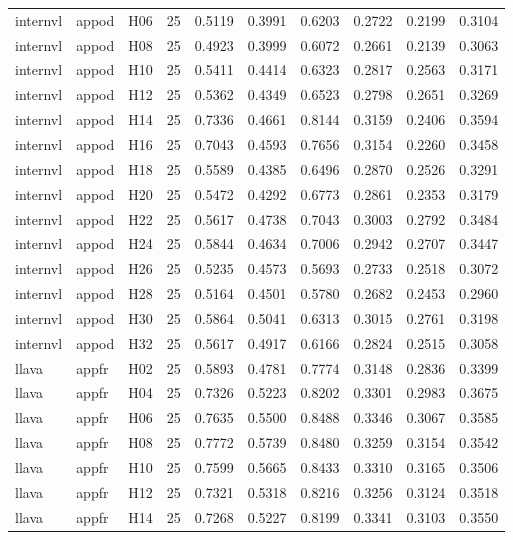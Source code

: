 \begin{table}[tbp]
\begin{tabular}{lllrrrrrrr}
internvl & appod & H06 & 25 & 0.5119 & 0.3991 & 0.6203 & 0.2722 & 0.2199 & 0.3104 \\
internvl & appod & H08 & 25 & 0.4923 & 0.3999 & 0.6072 & 0.2661 & 0.2139 & 0.3063 \\
internvl & appod & H10 & 25 & 0.5411 & 0.4414 & 0.6323 & 0.2817 & 0.2563 & 0.3171 \\
internvl & appod & H12 & 25 & 0.5362 & 0.4349 & 0.6523 & 0.2798 & 0.2651 & 0.3269 \\
internvl & appod & H14 & 25 & 0.7336 & 0.4661 & 0.8144 & 0.3159 & 0.2406 & 0.3594 \\
internvl & appod & H16 & 25 & 0.7043 & 0.4593 & 0.7656 & 0.3154 & 0.2260 & 0.3458 \\
internvl & appod & H18 & 25 & 0.5589 & 0.4385 & 0.6496 & 0.2870 & 0.2526 & 0.3291 \\
internvl & appod & H20 & 25 & 0.5472 & 0.4292 & 0.6773 & 0.2861 & 0.2353 & 0.3179 \\
internvl & appod & H22 & 25 & 0.5617 & 0.4738 & 0.7043 & 0.3003 & 0.2792 & 0.3484 \\
internvl & appod & H24 & 25 & 0.5844 & 0.4634 & 0.7006 & 0.2942 & 0.2707 & 0.3447 \\
internvl & appod & H26 & 25 & 0.5235 & 0.4573 & 0.5693 & 0.2733 & 0.2518 & 0.3072 \\
internvl & appod & H28 & 25 & 0.5164 & 0.4501 & 0.5780 & 0.2682 & 0.2453 & 0.2960 \\
internvl & appod & H30 & 25 & 0.5864 & 0.5041 & 0.6313 & 0.3015 & 0.2761 & 0.3198 \\
internvl & appod & H32 & 25 & 0.5617 & 0.4917 & 0.6166 & 0.2824 & 0.2515 & 0.3058 \\
llava & appfr & H02 & 25 & 0.5893 & 0.4781 & 0.7774 & 0.3148 & 0.2836 & 0.3399 \\
llava & appfr & H04 & 25 & 0.7326 & 0.5223 & 0.8202 & 0.3301 & 0.2983 & 0.3675 \\
llava & appfr & H06 & 25 & 0.7635 & 0.5500 & 0.8488 & 0.3346 & 0.3067 & 0.3585 \\
llava & appfr & H08 & 25 & 0.7772 & 0.5739 & 0.8480 & 0.3259 & 0.3154 & 0.3542 \\
llava & appfr & H10 & 25 & 0.7599 & 0.5665 & 0.8433 & 0.3310 & 0.3165 & 0.3506 \\
llava & appfr & H12 & 25 & 0.7321 & 0.5318 & 0.8216 & 0.3256 & 0.3124 & 0.3518 \\
llava & appfr & H14 & 25 & 0.7268 & 0.5227 & 0.8199 & 0.3341 & 0.3103 & 0.3550 \\

\end{tabular}
\end{table}
